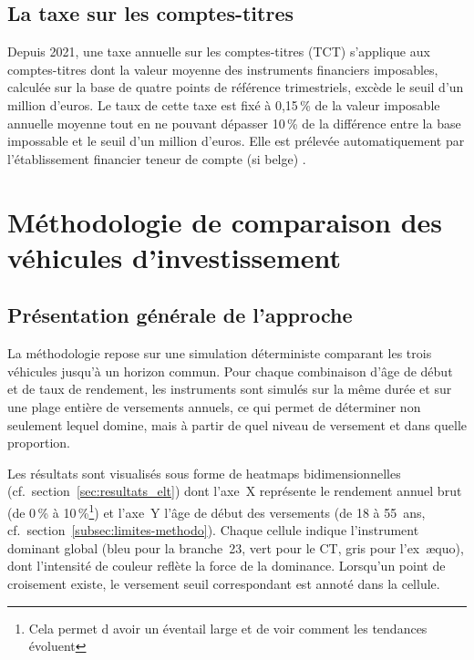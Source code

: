﻿\documentclass[12pt, a4paper]{article}
\begin{document}
\subsection{La taxe sur les comptes-titres}\label{subsub:tct_cto}

Depuis 2021,
une taxe annuelle sur les comptes-titres (TCT) s'applique
aux comptes-titres dont la valeur moyenne des instruments
financiers imposables, calculée sur la base de quatre
points de référence trimestriels, excède le seuil d'un
million d'euros. Le taux de cette taxe est fixé à 0,15\,\%
de la valeur imposable annuelle moyenne tout en ne pouvant dépasser
10\,\% de la différence entre la base impossable et le seuil
d'un million d'euros. Elle est prélevée
automatiquement par l'établissement financier teneur de
compte (si belge) \cite[art.~201]{cdtd1927}. 

\newpage

\section{Méthodologie de comparaison des véhicules d'investissement}
\label{sec:methodo}

\subsection{Présentation générale de l'approche}

La méthodologie repose sur une simulation déterministe comparant les trois
véhicules jusqu'à un horizon commun. Pour chaque combinaison
d'âge de début et de taux de rendement, les instruments sont simulés sur la
même durée et sur une plage entière de versements annuels, ce qui permet de
déterminer non seulement lequel domine, mais à partir de quel niveau de
versement et dans quelle proportion.

Les résultats sont visualisés sous forme de heatmaps bidimensionnelles (cf.~section~\ref{sec:resultats_elt}) dont
l'axe~X représente le rendement annuel brut (de 0\,\% à 10\,\%\footnote{Cela permet d avoir un éventail large et de voir comment les tendances évoluent}) et l'axe~Y
l'âge de début des versements (de 18 à 55~ans, cf.~section~\ref{subsec:limites-methodo}). Chaque cellule indique
l'instrument dominant global (bleu pour la branche~23, vert pour le CT, gris
pour l'ex~æquo), dont l'intensité de couleur reflète la force de la dominance.
Lorsqu'un point de croisement existe, le versement seuil correspondant est
annoté dans la cellule.
\end{document}
